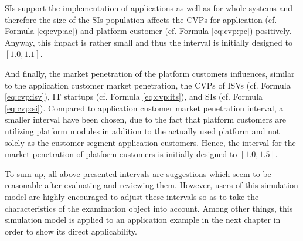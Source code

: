 \acp{SI} support the implementation of applications as well as for whole systems and therefore the size of the \acp{SI} population affects the \acp{CVP} for application (cf. Formula \ref{eq:cvp:ac}) and platform customer (cf. Formula \ref{eq:cvp:pc}) positively. Anyway, this impact is rather small and thus the interval is initially designed to $[1.0,1.1]$.

And finally, the market penetration of the platform customers influences, similar to the application customer market penetration, the \acp{CVP} of \acp{ISV} (cf. Formula \ref{eq:cvp:isv}), \ac{IT} startups (cf. Formula \ref{eq:cvp:its}), and \acp{SI} (cf. Formula \ref{eq:cvp:si}). Compared to application customer market penetration interval, a smaller interval have been chosen, due to the fact that platform customers are utilizing platform modules in addition to the actually used platform and not solely as the customer segment application customers. Hence, the interval for the market penetration of platform customers is initially designed to $[1.0,1.5]$.

To sum up, all above presented intervals are suggestions which seem to be reasonable after evaluating and reviewing them. However, users of this simulation model are highly encouraged to adjust these intervals so as to take the characteristics of the examination object into account. Among other things, this simulation model is applied to an application example in the next chapter in order to show its direct applicability.


